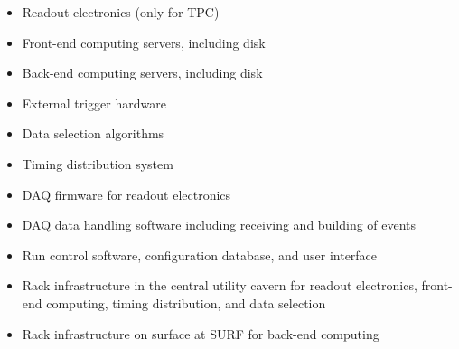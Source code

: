 \begin{itemize}
\item Readout electronics (only for TPC)
\item Front-end computing servers, including disk 
\item Back-end computing servers, including disk
\item External trigger hardware 
\item Data selection algorithms
\item Timing distribution system
\item DAQ firmware for readout electronics
\item DAQ data handling software including receiving and building of
  events
\item Run control software, configuration database, and user interface
\item Rack infrastructure in the central utility cavern for readout
  electronics, front-end computing, timing distribution, and data
  selection
\item Rack infrastructure on surface at SURF for back-end computing
\end{itemize}


